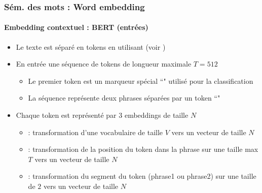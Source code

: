 \documentclass[xcolor=table]{beamer}
\begin{document}
\begin{frame}
\frametitle{Sém. des mots : Word embedding}
\framesubtitle{Embedding contextuel : BERT (entrées)}
	
\begin{itemize}
	\item Le texte est séparé en tokens en utilisant  (voir \cite{2016-wu-al})
	\item En entrée une séquence de tokens de longueur maximale $T = 512$
	\begin{itemize}
		\item Le premier token est un marqueur spécial ``\keyword{[CLS]}" utilisé pour la classification
		\item La séquence représente deux phrases séparées par un token ``\keyword{[SEP]}"
	\end{itemize}
	\item Chaque token est représenté par 3 embeddings de taille $N$ 
	\begin{itemize}
		\item {} : transformation d'une vocabulaire de taille $V$ vers un vecteur de taille $N$
		\item {} : transformation de la position du token dans la phrase sur une taille max $T$ vers un vecteur de taille $N$
		\item {} : transformation du segment du token (phrase1 ou phrase2) sur une taille de $2$ vers un vecteur de taille $N$
	\end{itemize}
\end{itemize}
	
\end{frame}
\end{document}
